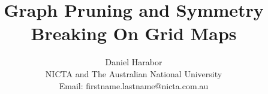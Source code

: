 \documentclass{article}
\begin{document}
\title{Graph Pruning and Symmetry Breaking On Grid Maps}
\author{Daniel Harabor \\ 
NICTA and The Australian National University \\
Email: firstname.lastname@nicta.com.au
}

\maketitle

%







\end{document}
